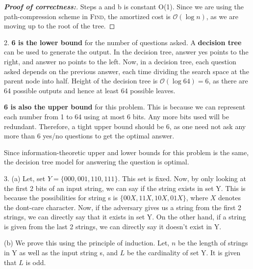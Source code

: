 \documentclass[assign]{article}
\begin{document}
\begin{proof}[\textbf{Proof of correctness:}] Steps a and b is constant O(1). Since we are using the path-compression scheme in \textsc{Find}, the amortized cost is $\mathcal{O}(\log n)$, as we are moving up to the root of the tree.
\end{proof}

\vspace{10pt}

\par 2. {\bf 6 is the lower bound} for the number of questions asked. A \textbf{decision tree} can be used to generate the output. In the decision tree, answer yes points to the right, and answer no points to the left. Now, in a decision tree, each question asked depends on the previous answer, each time dividing the search space at the parent node into half. Height of the decision tree is $\mathcal{O} (\log 64) = 6$, as there are 64 possible outputs and hence at least 64 possible leaves.

\par {\bf 6 is also the upper bound} for this problem. This is because we can represent each number from 1 to 64 using at most 6 bits. Any more bits used will be redundant. Therefore, a tight upper bound should be 6, as one need not ask any more than 6 yes/no questions to get the optimal answer. 

\par Since information-theoretic upper and lower bounds for this problem is the same, the decision tree model for answering the question is optimal.

\vspace{10pt}

\par 3. (a) Let, set $Y = \{000, 001, 110, 111\}$. This set is fixed. Now, by only looking at the first 2 bits of an input string, we can say if the string exists in set Y. This is because the possibilities for string s is $\{00X, 11X, 10X, 01X\}$, where $X$ denotes the dont-care character. Now, if the adversary gives us a string from the first 2 strings, we can directly say that it exists in set Y. On the other hand, if a string is given from the last 2 strings, we can directly say it doesn't exist in Y.

\par (b) We prove this using the principle of induction. Let, $n$ be the length of strings in Y as well as the input string s, and $L$ be the cardinality of set Y. It is given that $L$ is odd.
\end{document}
